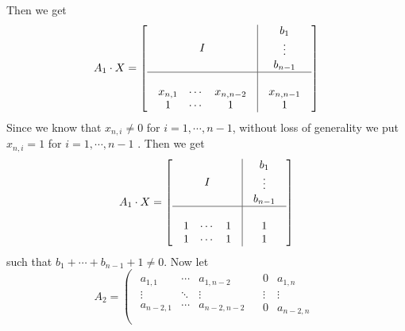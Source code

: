 \begin{example}
Then we get 
\[
	A_1\cdot X=
	\left[
	\begin{array}{c|c}
		I
		&
		\begin{array}{c}
			b_1  \\
			\vdots \\
			b_{n-1}
		\end{array}\\
		\hline\\
		\begin{array}{ccc}
			x_{n,1} & \cdots & x_{n,n-2} \\
			1      & \cdots  & 1
		\end{array}
		&
		\begin{array}{c}		
			x_{n,n-1} \\
			1		
		\end{array}			 
		\end{array}
		\right]
\]
Since we know that $x_{n,i}\neq 0$ for $i=1,\cdots,n-1$, without loss of generality we put $x_{n,i}=1$ for $i=1,\cdots,n-1$
. Then we get
\[
	A_1\cdot X =
	\left[
	\begin{array}{c|c}
		I
		&
		\begin{array}{c}
			b_1  \\
			\vdots \\
			b_{n-1}
		\end{array}\\
		\hline\\
		\begin{array}{ccc}
			1 & \cdots & 1 \\
			1 & \cdots & 1
		\end{array}
		&
		\begin{array}{c}		
			1 \\
			1		
		\end{array}			 
		\end{array}
		\right]
\]
such that $b_1+\cdots +b_{n-1}+1\neq 0$. Now let 
\[
	A_{2}=
	\left(
	\begin{array}{c|c}
		\begin{array}{ccc}
			a_{1,1}   & \cdots & a_{1,n-2} \\
			\vdots    & \ddots & \vdots \\
			a_{n-2,1} & \cdots & a_{n-2,n-2}
		\end{array}
		&
		\begin{array}{cc}
			0      & a_{1,n}  \\
			\vdots & \vdots \\
			0      & a_{n-2,n}
		\end{array}\\

\end{array}\]
\end{example}
